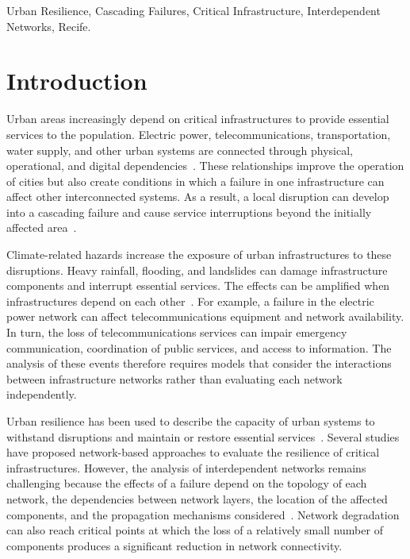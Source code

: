 \documentclass[journal]{IEEEtran}
\begin{document}
\begin{IEEEkeywords}
Urban Resilience, Cascading Failures, Critical Infrastructure, Interdependent Networks, Recife.
\end{IEEEkeywords}






%
\IEEEpeerreviewmaketitle



\section{Introduction}
Urban areas increasingly depend on critical infrastructures to provide essential services to the population. Electric power, telecommunications, transportation, water supply, and other urban systems are connected through physical, operational, and digital dependencies~\cite{Wang2026}. These relationships improve the operation of cities but also create conditions in which a failure in one infrastructure can affect other interconnected systems. As a result, a local disruption can develop into a cascading failure and cause service interruptions beyond the initially affected area~\cite{Wang2026,Chowdhury2026}.

Climate-related hazards increase the exposure of urban infrastructures to these disruptions. Heavy rainfall, flooding, and landslides can damage infrastructure components and interrupt essential services. The effects can be amplified when infrastructures depend on each other~\cite{Liu2025}. For example, a failure in the electric power network can affect telecommunications equipment and network availability. In turn, the loss of telecommunications services can impair emergency communication, coordination of public services, and access to information. The analysis of these events therefore requires models that consider the interactions between infrastructure networks rather than evaluating each network independently.

Urban resilience has been used to describe the capacity of urban systems to withstand disruptions and maintain or restore essential services~\cite{Yadav2019}. Several studies have proposed network-based approaches to evaluate the resilience of critical infrastructures. However, the analysis of interdependent networks remains challenging because the effects of a failure depend on the topology of each network, the dependencies between network layers, the location of the affected components, and the propagation mechanisms considered~\cite{Liu2025}. Network degradation can also reach critical points at which the loss of a relatively small number of components produces a significant reduction in network connectivity.
\end{document}
